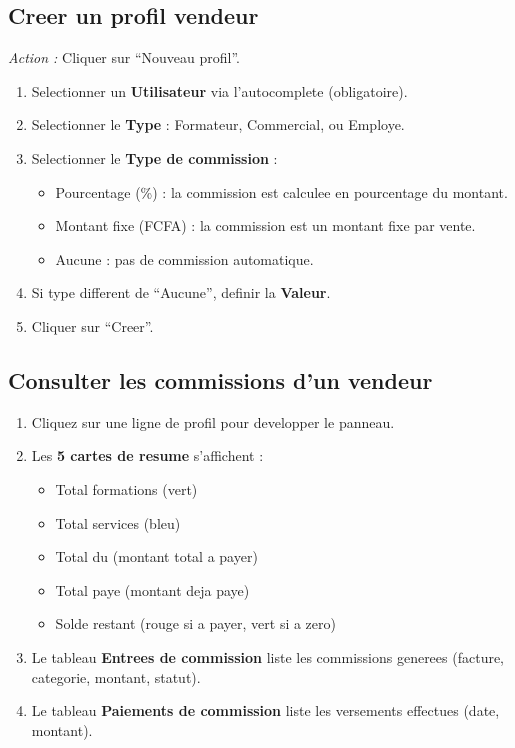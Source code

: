 \documentclass[a4paper,11pt]{article}
\newcommand{\etape}[1]{\textcolor{step}{\textbf{\'Etape :} #1}}
\newcommand{\action}[1]{\textcolor{brand}{\textit{Action :} #1}}
\begin{document}
\subsection{Creer un profil vendeur}
\action{Cliquer sur ``Nouveau profil''.}
\begin{enumerate}[label=\etape{\arabic*}]
  \item Selectionner un \textbf{Utilisateur} via l'autocomplete (obligatoire).
  \item Selectionner le \textbf{Type} : Formateur, Commercial, ou Employe.
  \item Selectionner le \textbf{Type de commission} :
    \begin{itemize}
      \item Pourcentage (\%) : la commission est calculee en pourcentage du montant.
      \item Montant fixe (FCFA) : la commission est un montant fixe par vente.
      \item Aucune : pas de commission automatique.
    \end{itemize}
  \item Si type different de ``Aucune'', definir la \textbf{Valeur}.
  \item Cliquer sur ``Creer''.
\end{enumerate}

\subsection{Consulter les commissions d'un vendeur}
\begin{enumerate}[label=\etape{\arabic*}]
  \item Cliquez sur une ligne de profil pour developper le panneau.
  \item Les \textbf{5 cartes de resume} s'affichent :
    \begin{itemize}
      \item Total formations (vert)
      \item Total services (bleu)
      \item Total du (montant total a payer)
      \item Total paye (montant deja paye)
      \item Solde restant (rouge si a payer, vert si a zero)
    \end{itemize}
  \item Le tableau \textbf{Entrees de commission} liste les commissions generees (facture, categorie, montant, statut).
  \item Le tableau \textbf{Paiements de commission} liste les versements effectues (date, montant).
\end{enumerate}
\end{document}
